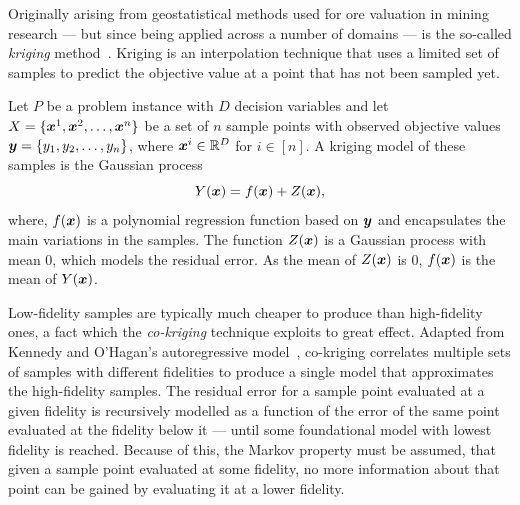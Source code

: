 Originally arising from geostatistical methods used for ore valuation in mining research --- but since being applied across a number of domains --- is the so-called \emph{kriging} method~\cite{forrester2008engineering}. Kriging is an interpolation technique that uses a limited set of samples to predict the objective value at a point that has not been sampled yet.

Let $P$ be a problem instance with $D$ decision variables and let $X = \{\boldsymbol{x}^1,\boldsymbol{x}^2,\dots,\boldsymbol{x}^n\}$ be a set of $n$ sample points with observed objective values $\boldsymbol{y} = \{y_1,y_2,\dots,y_n\}$, where $\boldsymbol{x}^i \in \mathbb{R}^D$ for $i \in [n]$. A kriging model of these samples is the Gaussian process 
\begin{equation}
Y(\boldsymbol{x}) = f(\boldsymbol{x}) + Z(\boldsymbol{x}),\label{eq:krig}
\end{equation}
where, $f(\boldsymbol{x})$ is a polynomial regression function based on $\boldsymbol{y}$ and encapsulates the main variations in the samples. The function $Z(\boldsymbol{x})$ is a Gaussian process with mean $0$, which models the residual error. As the mean of $Z(\boldsymbol{x})$ is 0, $f(\boldsymbol{x})$ is the mean of $Y(\boldsymbol{x})$. 



Low-fidelity samples are typically much cheaper to produce than high-fidelity ones, a fact which the \emph{co-kriging} technique exploits to great effect. Adapted from Kennedy and O'Hagan's autoregressive model~\cite{kennedy2000predicting}, co-kriging correlates multiple sets of samples with different fidelities to produce a single model that approximates the high-fidelity samples. The residual error for a sample point evaluated at a given fidelity is recursively modelled as a function of the error of the same point evaluated at the fidelity below it --- until some foundational model with lowest fidelity is reached. Because of this, the Markov property must be assumed, that given a sample point evaluated at some fidelity, no more information about that point can be gained by evaluating it at a lower fidelity.

